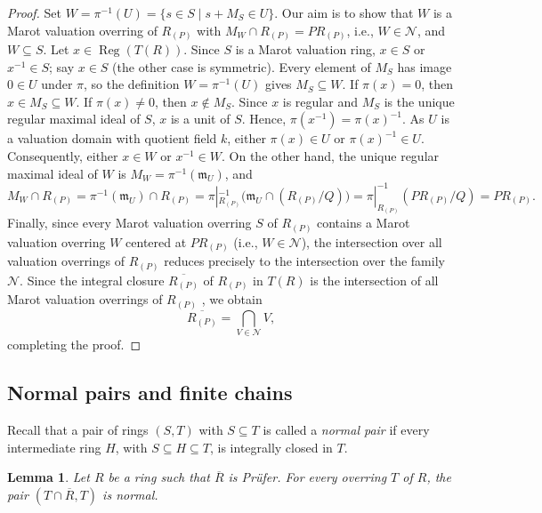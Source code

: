 \documentclass[12pt]{article}
\newtheorem{lemma}{Lemma}
\newcommand{\Reg}{\operatorname{Reg}}
\begin{document}
\begin{proof}
		Set $W=\pi^{-1}(U)=\{s\in S\mid s+M_S\in U\}$. Our aim is to show that $W$ is a Marot valuation overring of $R_{(P)}$ with $M_W\cap R_{(P)}=PR_{(P)}$, i.e., $W\in\mathcal N$, and $W\subseteq S$. Let $x\in\Reg(T(R))$. Since $S$ is a Marot valuation ring, $x\in S$ or $x^{-1}\in S$; say $x\in S$ (the other case is symmetric). Every element of $M_S$ has image $0\in U$ under $\pi$, so the definition $W=\pi^{-1}(U)$ gives $M_S\subseteq W$. If $\pi(x)=0$, then $x\in M_S\subseteq W$. If $\pi(x)\neq0$, then $x\notin M_S$. Since $x$ is regular and $M_S$ is the unique regular maximal ideal of $S$, $x$ is a unit of $S$. Hence, $\pi(x^{-1})=\pi(x)^{-1}$. As $U$ is a valuation domain with quotient field $k$, either $\pi(x)\in U$ or $\pi(x)^{-1}\in U$. Consequently, either $x\in W$ or $x^{-1}\in W$. On the other hand, the unique regular maximal ideal of $W$ is $M_W=\pi^{-1}(\mathfrak{m}_U)$, and
		\[
		M_W\cap R_{(P)}=\pi^{-1}(\mathfrak{m}_U)\cap R_{(P)}= \pi|_{R_{(P)}}^{-1} \bigl( \mathfrak{m}_U \cap(R_{(P)}/Q)\bigr)=\pi|_{R_{(P)}}^{-1}(PR_{(P)}/Q)=PR_{(P)}.
		\]
		Finally, since every Marot valuation overring $S$ of $R_{(P)}$ contains a Marot valuation overring $W$ centered at $PR_{(P)}$ (i.e., $W\in\mathcal N$), the intersection over all valuation overrings of $R_{(P)}$ reduces precisely to the intersection over the family $\mathcal N$. Since the integral closure $\overline{R_{(P)}}$ of $R_{(P)}$ in $T(R)$ is the intersection of all Marot valuation overrings of $R_{(P)}$ \cite[Theorem 9.3]{huckaba}, we obtain
		\[
		\overline{R_{(P)}}=\bigcap_{V\in\mathcal N}V,
		\]
		completing the proof.
	\end{proof}

	\subsection{Normal pairs and finite chains}
	Recall that a pair of rings $(S,T)$ with $S\subseteq T$ is called a \emph{normal pair} if every intermediate ring $H$, with $S\subseteq H\subseteq T$, is integrally closed in $T$.
	\begin{lemma}\label{normal-intersection}
		Let $R$ be a ring such that $\overline R$ is Prüfer. For every overring $T$ of $R$, the pair $(T\cap\overline R,T)$ is normal.
	\end{lemma}
	
\end{document}
